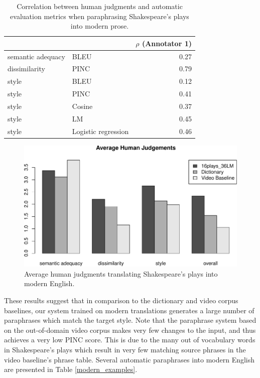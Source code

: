 \documentclass[10pt,a5paper,twoside]{article}
\begin{document}
\begin{table}
  \begin{center}
  \begin{tabular}{|l|l|r|}
    \hline
    & & $\rho$ (Annotator 1) \\
    \hline
    \hline
    semantic adequacy & BLEU & 0.27 \\
    \hline
    dissimilarity & PINC & 0.79 \\
    \hline
    style & BLEU & 0.12 \\
    \hline
    style & PINC & 0.41 \\
    \hline
    style & Cosine & 0.37 \\
    \hline
    style & LM & 0.45 \\
    \hline
    style & Logistic regression & 0.46 \\
    \hline
  \end{tabular}
  \end{center}
  \caption{Correlation between human judgments and automatic evaluation metrics when paraphrasing Shakespeare's plays into modern prose.}
  \label{correlation_s2m}
\end{table}

\begin{figure}[ht]
  \begin{center}
    \includegraphics[width=5in]{figures/human_judgements_s2m-crop.pdf}
  \end{center}
  \caption{Average human judgments translating Shakespeare's plays into modern English.} 
  \label{human_judgements_s2m}
\end{figure}

These results suggest that in comparison to the dictionary and video corpus baselines, 
our system trained on modern translations generates a large number of paraphrases which match the target style.
Note that the paraphrase system 
based on the out-of-domain video corpus makes very few changes to the input, and thus achieves a very low PINC score.  This is due to the many out of
vocabulary words in Shakespeare's plays which result in very few matching source phrases in the video baseline's phrase table.
Several automatic paraphrases into modern English are presented in Table \ref{modern_examples}.
\end{document}
